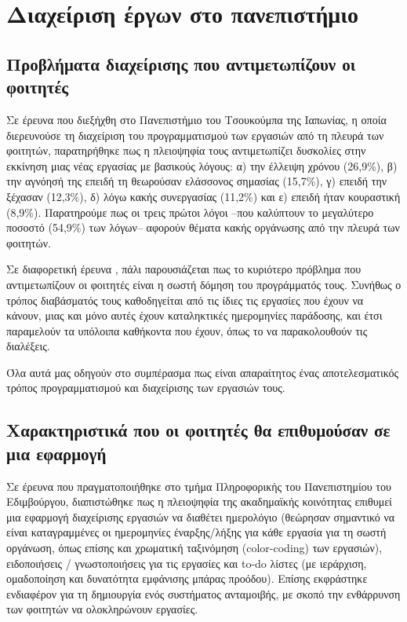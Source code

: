     \section{Διαχείριση έργων στο πανεπιστήμιο}
        \subsection{Προβλήματα διαχείρισης που αντιμετωπίζουν οι φοιτητές}
            
            Σε έρευνα \cite{Fukuzawa2015} που διεξήχθη στο Πανεπιστήμιο του Τσουκούμπα της Ιαπωνίας, η οποία διερευνούσε τη διαχείριση του προγραμματισμού των εργασιών από τη πλευρά των φοιτητών, παρατηρήθηκε πως η πλειοψηφία τους αντιμετωπίζει δυσκολίες στην εκκίνηση μιας νέας εργασίας με βασικούς λόγους: α) την έλλειψη χρόνου (26,9\%), β) την αγνόησή της επειδή τη θεωρούσαν ελάσσονος σημασίας (15,7\%), γ) επειδή την ξέχασαν (12,3\%), δ) λόγω κακής συνεργασίας (11,2\%) και ε) επειδή ήταν κουραστική (8,9\%). Παρατηρούμε πως οι τρεις πρώτοι λόγοι --που καλύπτουν το μεγαλύτερο ποσοστό (54,9\%) των λόγων-- αφορούν θέματα κακής οργάνωσης από την πλευρά των φοιτητών.
           
            Σε διαφορετική έρευνα \cite{Trujillo2020}, πάλι παρουσιάζεται πως το κυριότερο πρόβλημα που αντιμετωπίζουν οι φοιτητές είναι η σωστή δόμηση του προγράμματός τους. Συνήθως ο τρόπος διαβάσματός τους καθοδηγείται από τις ίδιες τις εργασίες που έχουν να κάνουν, μιας και μόνο αυτές έχουν καταληκτικές ημερομηνίες παράδοσης, και έτσι παραμελούν τα υπόλοιπα καθήκοντα που έχουν, όπως το να παρακολουθούν τις διαλέξεις.

            Όλα αυτά μας οδηγούν στο συμπέρασμα πως είναι απαραίτητος ένας αποτελεσματικός τρόπος προγραμματισμού και διαχείρισης των εργασιών τους.

        \subsection{Χαρακτηριστικά που οι φοιτητές θα επιθυμούσαν σε μια εφαρμογή}
            Σε έρευνα \cite{Trujillo2020} που πραγματοποιήθηκε στο τμήμα Πληροφορικής του Πανεπιστημίου του Εδιμβούργου, διαπιστώθηκε πως η πλειοψηφία της ακαδημαϊκής κοινότητας επιθυμεί μια εφαρμογή διαχείρισης εργασιών να διαθέτει ημερολόγιο (θεώρησαν σημαντικό να είναι καταγραμμένες οι ημερομηνίες έναρξης/λήξης για κάθε εργασία για τη σωστή οργάνωση, όπως επίσης και χρωματική ταξινόμηση (color-coding) των εργασιών), ειδοποιήσεις / γνωστοποιήσεις για τις εργασίες και to-do λίστες (με ιεράρχιση, ομαδοποίηση και δυνατότητα εμφάνισης μπάρας προόδου). Επίσης εκφράστηκε ενδιαφέρον για τη δημιουργία ενός συστήματος ανταμοιβής, με σκοπό την ενθάρρυνση των φοιτητών να ολοκληρώνουν εργασίες.